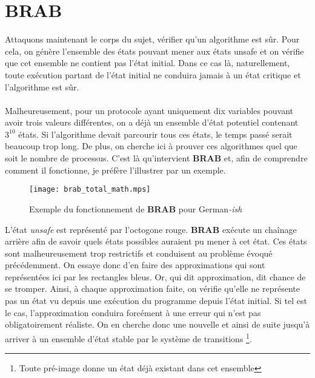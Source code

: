 \documentclass{memoir}
\begin{document}
		\section{BRAB}
		\label{sec:brab}
				
		Attaquons maintenant le corps du sujet, vérifier qu'un algorithme est sûr. Pour cela, on génère l'ensemble des états pouvant mener aux états unsafe et on vérifie que cet ensemble ne contient pas l'état initial. Dans ce cas là, naturellement, toute exécution partant de l'état initial ne conduira jamais à un état critique et l'algorithme est sûr. 
		
		\paragraph{} Malheureusement, pour un protocole ayant uniquement dix variables pouvant avoir trois valeurs différentes, on a déjà un ensemble d'état potentiel contenant $3^{10}$ états. Si l'algorithme devait parcourir tous ces états, le temps passé serait beaucoup trop long. De plus, on cherche ici à prouver ces algorithmes quel que soit le nombre de processus. C'est là qu'intervient \textbf{BRAB} et, afin de comprendre comment il fonctionne, je préfère l'illustrer par un exemple.
		
		\begin{figure}[H]
  			\centering 
  			\texttt{[image: brab\_total\_math.mps]}
  			\caption{Exemple du fonctionnement de \textbf{BRAB} pour German\textit{-ish}}
  			\label{fig:brab_total}
		\end{figure}

		L'état \textit{unsafe} est représenté par l'octogone rouge. \textbf{BRAB} exécute un chaînage arrière afin de savoir quels états possibles auraient pu mener à cet état. Ces états sont malheureusement trop restrictifs et conduisent au problème évoqué précédemment. On essaye donc d'en faire des approximations qui sont représentées ici par les rectangles bleus. Or, qui dit approximation, dit chance de se tromper. Ainsi, à chaque approximation faite, on vérifie qu'elle ne représente pas un état vu depuis une exécution du programme depuis l'état initial. Si tel est le cas, l'approximation conduira forcément à une erreur qui n'est pas obligatoirement réaliste. On en cherche donc une nouvelle et ainsi de suite jusqu'à arriver à un ensemble d'état stable par le système de transitions \footnote{Toute pré-image donne un état déjà existant dans cet ensemble}.
		
\end{document}
